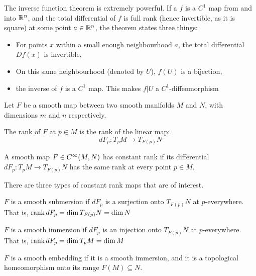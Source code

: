 \documentclass[../main-manifolds.tex]{subfiles}
\begin{document}
\begin{remark}
    The inverse function theorem is extremely powerful. If a $f$ is a $C^1$ map from and into ${\mathbb{R}^n}$, and the total differential of $f$ is full rank (hence invertible, as it is square) at some point $a\in{\mathbb{R}^n}$, the theorem states three things:
    \begin{itemize}
        \item For points $x$ within a small enough neighbourhood $a$, the total differential $Df(x)$ is invertible,
        \item On this same neighbourhood (denoted by $U$), $f(U)$ is a bijection,
        \item the inverse of $f$ is a $C^1$ map. This makes $f|U$ a $C^1$-diffeomorphism
    \end{itemize}
\end{remark}

Let $F$ be a smooth map between two smooth manifolds $M$ and $N$, with dimensions $m$ and $n$ respectively.


\begin{definition}
    The rank of $F$ at $p\in M$ is the rank of the linear map:
\[
    dF_p: T_pM\to T_{F(p)}N
\]\end{definition}

\begin{definition}
A smooth map $F\in \cinf[M,N]$ has constant rank if its differential $dF_p: T_pM\to T_{F(p)}N$ has the same rank at every point $p\in M$.\end{definition}

There are three types of constant rank maps that are of interest. 
\begin{definition}\label{lee-chp4:smooth-submersion-definition}
    $F$ is a smooth submersion if $dF_p$ is a surjection onto $T_{F(p)}N$ at $p$-everywhere. That is, $\operatorname{rank} dF_p = \operatorname{dim} T_{F(p)}N = \operatorname{dim} N$\end{definition}

\begin{definition}\label{lee-chp4:smooth-immersion-definition}
    $F$ is a smooth immersion if $dF_p$ is an injection onto $T_{F(p)}N$ at $p$-everywhere. That is, $\operatorname{rank} dF_p = \operatorname{dim} T_{p}M = \operatorname{dim} M$\end{definition}


\begin{definition}\label{lee-chp4:smooth-embedding-definition}
    $F$ is a smooth embedding if it is a smooth immersion, and it is a topological homeomorphism onto its range $F(M)\subseteq N$. 
\end{definition}
\end{document}
